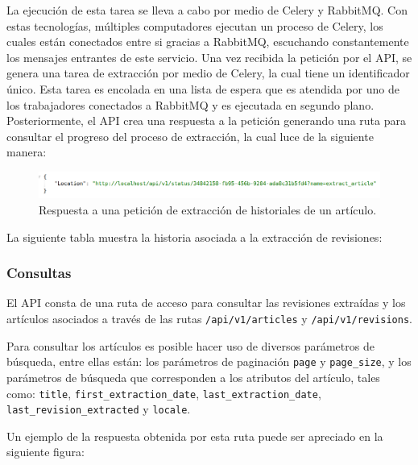 La ejecución de esta tarea se lleva a cabo por medio de Celery y RabbitMQ.
Con estas tecnologías, múltiples computadores ejecutan un proceso de Celery, los
cuales están conectados entre si gracias a RabbitMQ, escuchando constantemente los mensajes entrantes de este servicio.
Una vez recibida la petición por el API, se genera una tarea de extracción por medio de Celery, la cual tiene un identificador único. Esta tarea es encolada en una lista de
espera que es atendida por uno de los trabajadores conectados a RabbitMQ y es ejecutada en segundo plano.
Posteriormente, el API crea una respuesta a la petición generando una ruta para consultar el progreso
del proceso de extracción, la cual luce de la siguiente manera:

\begin{figure}[H]
	\centering
		\includegraphics[width=1\textwidth]{figures/extract_response}
	\caption{Respuesta a una petición de extracción de historiales de un artículo.}
	\label{fig:extract_response}
\end{figure}

La siguiente tabla muestra la historia asociada a la extracción de revisiones:



\subsubsection{Consultas}

El API consta de una ruta de acceso para consultar las revisiones extraídas y
los artículos asociados a través de las rutas \texttt{/api/v1/articles} y \texttt{/api/v1/revisions}.

Para consultar los artículos es posible hacer uso de diversos parámetros de búsqueda,
entre ellas están: los parámetros de paginación \texttt{page} y \texttt{page\_size},
y los parámetros de búsqueda que corresponden a los atributos del artículo,
tales como: \texttt{title}, \texttt{first\_extraction\_date}, \texttt{last\_extraction\_date}, \texttt{last\_revision\_extracted} y \texttt{locale}.

Un ejemplo de la respuesta obtenida por esta ruta puede ser apreciado en la siguiente figura:

